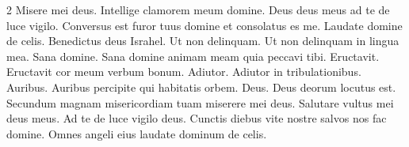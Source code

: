 \begin{multicols*}{2}
 Misere mei deus.
 Intellige clamorem meum domine.
 Deus deus meus ad te de luce vigilo.
 Conversus est furor tuus domine et consolatus es me.
 Laudate domine de celis.
 Benedictus deus Israhel.
 Ut non delinquam.
 Ut non delinquam in lingua mea.
 Sana domine.
 Sana domine animam meam quia peccavi tibi.
 Eructavit.
 Eructavit cor meum verbum bonum.
 Adiutor.
 Adiutor in tribulationibus.
 Auribus.
 Auribus percipite qui habitatis orbem.
 Deus.
 Deus deorum locutus est.
 Secundum magnam misericordiam tuam miserere mei deus.
 Salutare vultus mei deus meus.
 Ad te de luce vigilo deus.
 Cunctis diebus vite nostre salvos nos fac domine.
 Omnes angeli eius laudate dominum de celis.

\end{multicols*}
